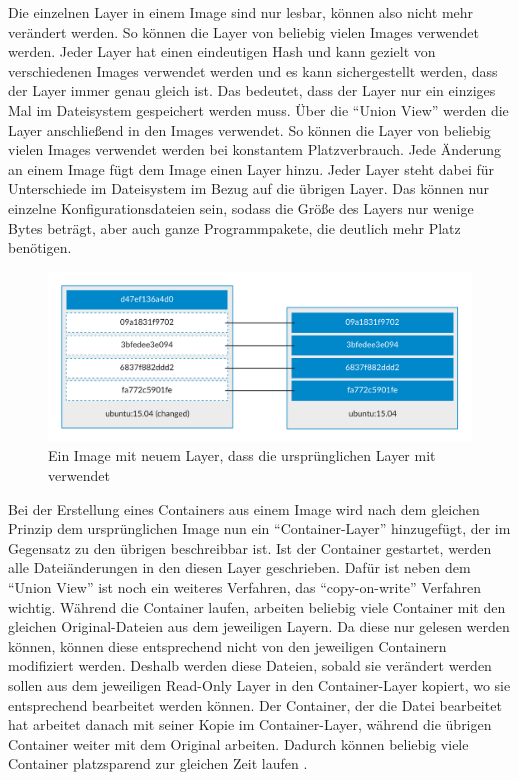 Die einzelnen Layer in einem Image sind nur lesbar, können also nicht mehr verändert werden. So können die Layer von beliebig vielen Images verwendet werden. Jeder Layer hat einen eindeutigen Hash und kann gezielt von verschiedenen Images verwendet werden und es kann sichergestellt werden, dass der Layer immer genau gleich ist. Das bedeutet, dass der Layer nur ein einziges Mal im Dateisystem gespeichert werden muss. Über die “Union View” werden die Layer anschließend in den Images verwendet. So können die Layer von beliebig vielen Images verwendet werden bei konstantem Platzverbrauch. Jede Änderung an einem Image fügt dem Image einen Layer hinzu. Jeder Layer steht dabei für Unterschiede im Dateisystem im Bezug auf die übrigen Layer. Das können nur einzelne Konfigurationsdateien sein, sodass die Größe des Layers nur wenige Bytes beträgt, aber auch ganze Programmpakete, die deutlich mehr Platz benötigen.\\

\begin{figure}[!ht]
  \centering
  \includegraphics[width=1\textwidth]{images/10-docker-image-layer-sharing.png}
  \caption{Ein Image mit neuem Layer, dass die ursprünglichen Layer mit verwendet \cite{docker:images}}
\end{figure}

Bei der Erstellung eines Containers aus einem Image wird nach dem gleichen Prinzip dem ursprünglichen Image nun ein “Container-Layer” hinzugefügt, der im Gegensatz zu den übrigen beschreibbar ist. Ist der Container gestartet, werden alle Dateiänderungen in den diesen Layer geschrieben. Dafür ist neben dem “Union View” ist noch ein weiteres Verfahren, das “copy-on-write” Verfahren wichtig. Während die Container laufen, arbeiten beliebig viele Container mit den gleichen Original-Dateien aus dem jeweiligen Layern. Da diese nur gelesen werden können, können diese entsprechend nicht von den jeweiligen Containern modifiziert werden. Deshalb werden diese Dateien, sobald sie verändert werden sollen aus dem jeweiligen Read-Only Layer in den Container-Layer kopiert, wo sie entsprechend bearbeitet werden können.
Der Container, der die Datei bearbeitet hat arbeitet danach mit seiner Kopie im Container-Layer, während die übrigen Container weiter mit dem Original arbeiten. Dadurch können beliebig viele Container platzsparend zur gleichen Zeit laufen \cite{docker:images}.\\

